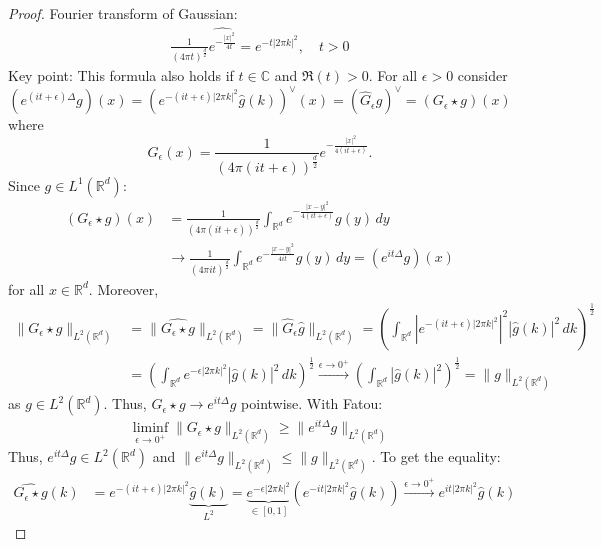 \documentclass{report}
\theoremstyle{tommy}
\begin{document}
  \begin{proof}
    Fourier transform of Gaussian:
    \begin{align*}
      \frac{1}{(4 \pi t)^{\frac{d}{2}}} \widehat{e^{- \frac{|x|^2}{4t}}} = e^{-t |2 \pi k|^2}, \quad t > 0
    \end{align*}
    Key point: This formula also holds if \(t \in \mathbb{C}\) and \(\Re(t) > 0\).
    For all \(\epsilon > 0\) consider
    \[(e^{(it + \epsilon)\Delta} g)(x) = \left(e^{-(it + \epsilon) |2 \pi k|^2} \hat g (k)\right)^\lor (x) = (\hat G_\epsilon g)^\lor = (G_\epsilon \star g) (x)\] where 
    \[G_\epsilon(x) = \frac{1}{(4 \pi (it + \epsilon))^{\frac{d}{2}}} e^{- \frac{|x|^2}{4 (it + \epsilon)}}.\]
    Since \(g \in L^1(\mathbb{R}^d)\):
    \begin{align*}
      (G_\epsilon \star g)(x) &= \frac{1}{(4 \pi (it + \epsilon))^{\frac{d}{2}}} \int_{\mathbb{R}^d} e^{- \frac{|x-y|^2}{4(it + \epsilon)}} g(y) \, dy \\
      &\longrightarrow \frac{1}{(4 \pi it)^{\frac{d}{2}}} \int_{\mathbb{R}^d} e^{- \frac{|x-y|^2}{4 i t}} g(y) \, dy = (e^{it \Delta}g)(x)
    \end{align*}
    for all \(x \in \mathbb{R}^d\).
    Moreover, 
    \begin{align*}
      \|G_\epsilon \star g\|_{L^2(\mathbb{R}^d)} &= \| \widehat{G_\epsilon \star g} \|_{L^2(\mathbb{R}^d)} = \|\hat G_\epsilon \hat g\|_{L^2(\mathbb{R}^d)} = \left(\int_{\mathbb{R}^d} \left|e^{-(it + \epsilon)|2 \pi k|^2}\right|^2|\hat g (k)|^2 \, dk\right)^{\frac{1}{2}} \\
      &= \left(\int_{\mathbb{R}^d}e^{-\epsilon |2 \pi k|^2}|\hat g (k)|^2 \, dk\right)^{\frac{1}{2}} \xrightarrow{\epsilon \to 0^+} \left(\int_{\mathbb{R}^d} |\hat g(k)|^2\right)^{\frac{1}{2}} = \|g\|_{L^2(\mathbb{R}^d)}
    \end{align*}
    as \(g \in L^2(\mathbb{R}^d)\). Thus, \(G_\epsilon \star g \to e^{i t \Delta} g\) pointwise. With Fatou:
    \begin{align*}
      \liminf_{\epsilon \to 0^+} \|G_\epsilon \star g\|_{L^2(\mathbb{R}^d)} \ge \|e^{i t \Delta} g\|_{L^2(\mathbb{R}^d)}
    \end{align*}
    Thus, \(e^{it \Delta} g \in L^2(\mathbb{R}^d)\) and  \(\|e^{it \Delta} g\|_{L^2(\mathbb{R}^d)} \le \|g\|_{L^2(\mathbb{R}^d)}\).
    To get the equality:
    \begin{align*}
      \widehat{G_\epsilon \star g}(k) &= e^{-(it + \epsilon)|2 \pi k|^2}  \underbrace{\hat g(k)}_{L^2} = \underbrace{e^{-\epsilon | 2 \pi k|^2}}_{\in [0,1]} \left(e^{-it |2 \pi k|^2} \hat g(k)\right) \xrightarrow{\epsilon \to 0^+} e^{it|2 \pi k|^2} \hat g(k)

\end{align*}
\end{proof}
\end{document}
